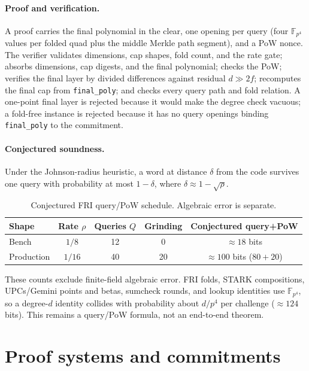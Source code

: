 \documentclass[11pt,a4paper]{article}
\newcommand{\wFpFour}{\mathbb{F}_{p^4}}
\begin{document}
\paragraph{Proof and verification.} A proof carries the final polynomial in
the clear, one opening per query (four $\wFpFour$ values per folded quad plus
the middle Merkle path segment), and a PoW nonce. The verifier validates
dimensions, cap shapes, fold count, and the rate gate; absorbs dimensions,
cap digests, and the final polynomial; checks the PoW; verifies the final
layer by divided differences against residual $d\gg2f$; recomputes the final
cap from \texttt{final\_poly}; and checks every query path and fold relation.
A one-point final layer is rejected because it would make the degree check
vacuous; a fold-free instance is rejected because it has no query openings
binding \texttt{final\_poly} to the commitment.

\paragraph{Conjectured soundness.} Under the Johnson-radius heuristic, a word
at distance $\delta$ from the code survives one query with probability at most
$1-\delta$, where $\delta\approx1-\sqrt{\rho}$.

\begin{table}[h]
\centering
\small
\begin{tabular}{@{}lcccc@{}}
\toprule
Shape & Rate $\rho$ & Queries $Q$ & Grinding & Conjectured query+PoW \\
\midrule
Bench & $1/8$ & 12 & 0 & $\approx18$ bits \\
Production & $1/16$ & 40 & 20 & $\approx100$ bits ($80+20$) \\
\bottomrule
\end{tabular}
\caption{Conjectured FRI query/PoW schedule. Algebraic error is separate.}
\end{table}

These counts exclude finite-field algebraic error. FRI folds, STARK
compositions, UPCs/Gemini points and betas, sumcheck rounds, and lookup
identities use $\wFpFour$, so a degree-$d$ identity collides with probability
about $d/p^4$ per challenge ($\approx124$ bits). This remains a query/PoW
formula, not an end-to-end theorem.

\section{Proof systems and commitments}
\end{document}
